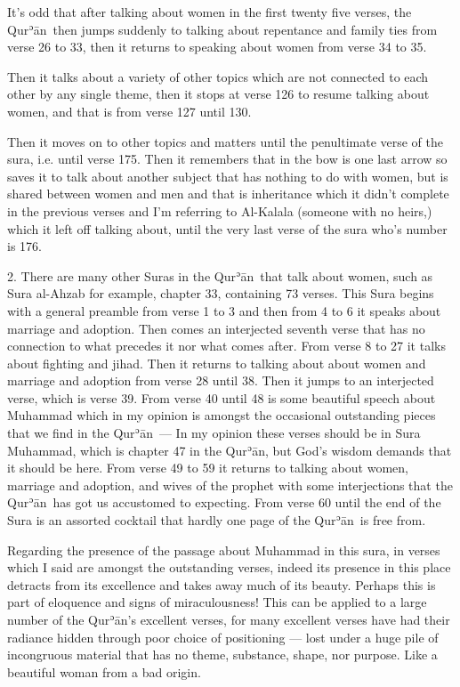 \documentclass[12pt]{memoir}
\def\´{ʾ} %
\def \Quran{Qur\-\´ān} %
\def\–{-\hskip0pt}
\def\fnmarksym[#1]{\def\thefootnote{#1}\footnotemark%
\addtocounter{footnote}{-1}}
\begin{document}
It’s odd that after talking about women in the first twenty five verses,
the \Quran\ then jumps suddenly to talking about repentance
and family ties from verse 26 to 33,
then it returns to speaking about women from verse 34 to 35.

Then it talks about a variety of other topics
which are not connected to each other by any single theme,
then it stops at verse 126 to resume talking about women,
and that is from verse 127 until 130.

Then it moves on to other topics and matters until the penultimate verse
of the sura, i.e. until verse 175.
Then it remembers that in the bow is one last arrow
so saves it to talk about another subject that has nothing to do with women,
but is shared between women and men and that is inheritance
which it didn’t complete in the previous verses
and I’m referring to Al\–Kalala (someone with no heirs,)
which it left off talking about,
until the very last verse of the sura who’s number is 176.

2. There are many other Suras in the \Quran\ that talk about women,
such as Sura al\–Ahzab for example, chapter 33, containing 73 verses.
This Sura begins with a general preamble from verse 1 to 3
and then from 4 to 6 it speaks about marriage and adoption.
Then comes an interjected seventh verse that has no connection
to what precedes it nor what comes after.
From verse 8 to 27 it talks about fighting and jihad.
Then it returns to talking about about women and marriage
and adoption from verse 28 until 38.
Then it jumps to an interjected verse, which is verse 39.
From verse 40 until 48 is some beautiful speech about Muhammad
which in my opinion is amongst the occasional outstanding pieces
that we find in the \Quran\ —
In my opinion these verses should be in Sura Muhammad,
which is chapter 47 in the \Quran, but God’s wisdom demands
that it should be here.
From verse 49 to 59 it returns to talking about women,
marriage and adoption, and wives of the prophet with some interjections
that the \Quran\ has got us accustomed to expecting.
From verse 60 until the end of the Sura is an assorted cocktail
that hardly one page of the \Quran\ is free from.

Regarding the presence of the passage about Muhammad in this sura,
in verses which I said are amongst the outstanding verses,
indeed its presence in this place detracts from its excellence
and takes away much of its beauty.
Perhaps this is part of eloquence and signs of miraculousness!
This can be applied to a large number of the \Quran’s excellent verses,
for many excellent verses have had their radiance hidden
through poor choice of positioning —
lost under a huge pile of incongruous material
that has no theme, substance, shape, nor purpose.
Like a beautiful woman from a bad origin.\fnmarksym[*]
\end{document}
